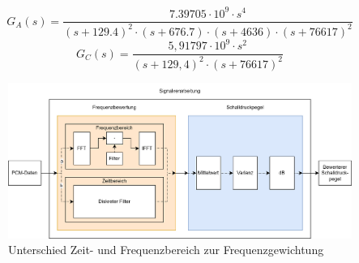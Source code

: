 \documentclass[12pt]{article}
\begin{document}
	\begin{equation}\label{G_A_s}
		G_A(s) = \frac{7.39705 \cdot 10^9 \cdot s^4}{(s+129.4)^2\cdot (s+676.7)\cdot (s+4636)\cdot (s+76617)^2}
	\end{equation}
		\begin{equation}\label{G_C_s}
		G_C	(s) = \frac{5,91797 \cdot 10^9 \cdot s^2}{(s+129,4)^2\cdot (s+76617)^2}
	\end{equation}
	\begin{figure}[H]
		\centering
		\includegraphics[width=1\linewidth]{images/BAT_Frequenzgewichtung}
		\caption{Unterschied Zeit- und Frequenzbereich zur Frequenzgewichtung}
		\label{fig:batfrequenzgewichtung}
	\end{figure}
\end{document}
